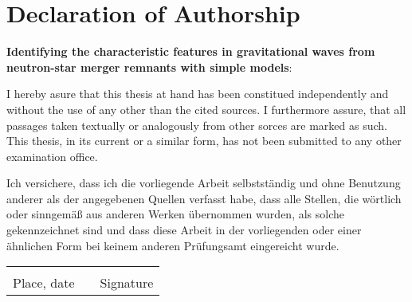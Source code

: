 \newpage
\chapter*{Declaration of Authorship}

\vspace*{1cm}
\textbf{Identifying the characteristic features in gravitational waves from neutron-star merger remnants with simple models}:
\vspace*{2cm}

\noindent I hereby asure that this thesis at hand has been constitued independently and without the use of any other than the cited sources. I furthermore assure, that all passages taken textually or analogously  from other sorces are marked as such. This thesis, in its current or a similar form, has not been submitted to any other examination office.

\vspace{1cm}

\noindent Ich versichere, dass ich die vorliegende Arbeit selbstständig und ohne Benutzung anderer als der angegebenen Quellen verfasst habe, dass alle Stellen, die wörtlich oder sinngemäß aus anderen Werken übernommen wurden, als solche gekennzeichnet sind und dass diese Arbeit in der vorliegenden oder einer ähnlichen Form bei keinem anderen Prüfungsamt eingereicht wurde. 




\vspace*{5em}

\begin{table}[h]

\begin{tabular}{p{2.5in}p{1.2in}p{2.5in}}
\hrulefill && \hrulefill\\
Place, date && \multicolumn{1}{r}{Signature}\\
\end{tabular}


\end{table}
%
%
%

%
%
%
